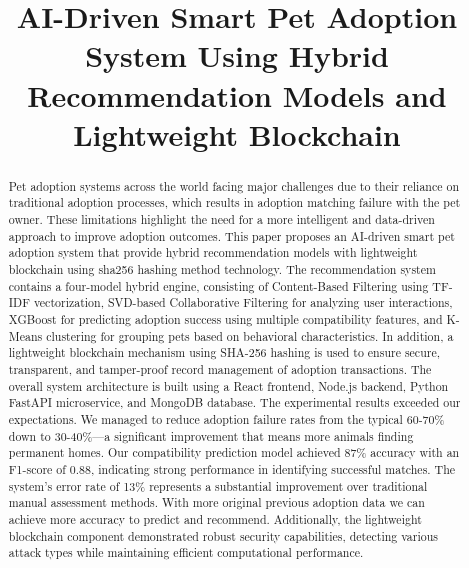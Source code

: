 \documentclass[conference]{IEEEtran}
\begin{document}
\title{AI-Driven Smart Pet Adoption System Using Hybrid Recommendation Models and Lightweight Blockchain}

\author{
\and
{}
}

\maketitle

\begin{abstract}
Pet adoption systems across the world facing major challenges due to their reliance on traditional adoption processes, which results in adoption matching failure with the pet owner. These limitations highlight the need for a more intelligent and data-driven approach to improve adoption outcomes. This paper proposes an AI-driven smart pet adoption system that provide hybrid recommendation models with lightweight blockchain using sha256 hashing method technology. The recommendation system contains a four-model hybrid engine, consisting of Content-Based Filtering using TF-IDF vectorization, SVD-based Collaborative Filtering for analyzing user interactions, XGBoost for predicting adoption success using multiple compatibility features, and K-Means clustering for grouping pets based on behavioral characteristics. In addition, a lightweight blockchain mechanism using SHA-256 hashing is used to ensure secure, transparent, and tamper-proof record management of adoption transactions. The overall system architecture is built using a React frontend, Node.js backend, Python FastAPI microservice, and MongoDB database. The experimental results exceeded our expectations. We managed to reduce adoption failure rates from the typical 60-70\% down to 30-40\%—a significant improvement that means more animals finding permanent homes. Our compatibility prediction model achieved 87\% accuracy with an F1-score of 0.88, indicating strong performance in identifying successful matches. The system's error rate of 13\% represents a substantial improvement over traditional manual assessment methods. With more original previous adoption data we can achieve more accuracy to predict and recommend. Additionally, the lightweight blockchain component demonstrated robust security capabilities, detecting various attack types while maintaining efficient computational performance.
\end{abstract}
\end{document}
